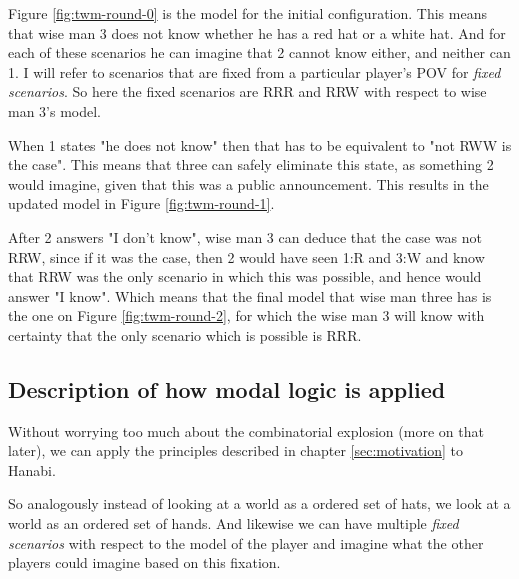 Figure \ref{fig:twm-round-0} is the model for the initial configuration. This means that wise man 3 does not know whether he has a red hat or a white hat. And for each of these scenarios he can imagine that 2 cannot know either, and neither can 1. I will refer to scenarios that are fixed from a particular player's POV for \emph{fixed scenarios}. So here the fixed scenarios are RRR and RRW with respect to wise man 3's model.

When 1 states "he does not know" then that has to be equivalent to "not RWW is the case". This means that three can safely eliminate this state, as something 2 would imagine, given that this was a public announcement. This results in the updated model in Figure \ref{fig:twm-round-1}.


After 2 answers "I don't know", wise man 3 can deduce that the case was not RRW, since if it was the case, then 2 would have seen 1:R and 3:W and know that RRW was the only scenario in which this was possible, and hence would answer "I know". Which means that the final model that wise man three has is the one on Figure \ref{fig:twm-round-2}, for which the wise man 3 will know with certainty that the only scenario which is possible is RRR.


\subsection{Description of how modal logic is applied} \label{sec:description-of-how-modal-logic-is_applied}
Without worrying too much about the combinatorial explosion (more on that later), we can apply the principles described in chapter \ref{sec:motivation} to Hanabi. 

So analogously instead of looking at a world as a ordered set of hats, we look at a world as an ordered set of hands. And likewise we can have multiple \emph{fixed scenarios} with respect to the model of the player and imagine what the other players could imagine based on this fixation. 

